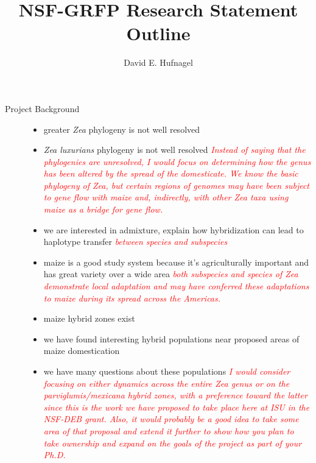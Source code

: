 \documentclass[11pt]{amsart}
\title{NSF-GRFP Research Statement Outline}
\author{David E. Hufnagel}
\newcommand{\mbh}[1]{\textcolor{red}{ \emph{\scriptsize  #1}} }
\begin{document}
\maketitle

\begin{description}
	\item[Project Background] \hfill
		\begin{itemize}
			\item greater \emph{Zea} phylogeny is not well resolved
			\item \emph{Zea luxurians} phylogeny is not well resolved
			\mbh{Instead of saying that the phylogenies are unresolved, I would focus on determining how the genus has been altered by the spread of the domesticate.  We know the basic phylogeny of \emph{Zea}, but certain regions of genomes may have been subject to gene flow with maize and, indirectly, with other \emph{Zea} taxa using maize as a bridge for gene flow.}
			\item we are interested in admixture, explain how hybridization can lead to haplotype transfer \mbh{between species and subspecies}
			\item maize is a good study system because it's agriculturally important and has great variety over a wide area \mbh{both subspecies and species of \emph{Zea} demonstrate local adaptation and may have conferred these adaptations to maize during its spread across the Americas.}
			\item maize hybrid zones exist
			\item we have found interesting hybrid populations near proposed areas of maize domestication
			\item we have many questions about these populations
			\mbh{I would consider focusing on either dynamics across the entire \emph{Zea} genus or on the \emph{parviglumis}/\emph{mexicana} hybrid zones, with a preference toward the latter since this is the work we have proposed to take place here at ISU in the NSF-DEB grant.  Also, it would probably be a good idea to take some area of that proposal and extend it further to show how you plan to take ownership and expand on the goals of the project as part of your Ph.D.}
		\end{itemize}

\end{description}
\end{document}

